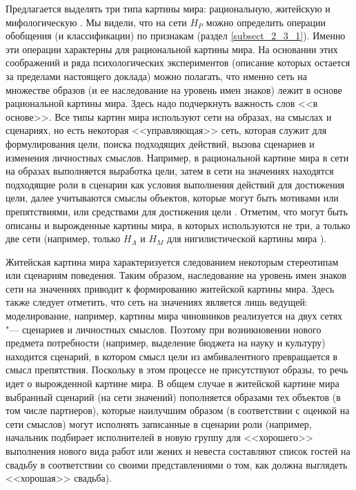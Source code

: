 Предлагается выделять три типа картины мира: рациональную, житейскую и мифологическую \cite{Chudova2012}. 
Мы видели, что на сети $H_P$ можно определить операции обобщения (и классификации) по признакам (раздел \ref{subsect_2_3_1}). Именно эти операции характерны для рациональной картины мира. На основании этих соображений и ряда психологических экспериментов (описание которых остается за пределами настоящего доклада) можно полагать, что именно сеть на множестве образов (и ее наследование на уровень имен знаков) лежит в основе рациональной картины мира. Здесь надо подчеркнуть важность слов <<в основе>>. Все типы картин мира используют сети на образах, на смыслах и сценариях, но есть некоторая <<управляющая>> сеть, которая служит для формулирования цели, поиска подходящих действий, вызова сценариев и изменения личностных смыслов. Например, в рациональной картине мира в сети на образах выполняется выработка цели, затем в сети на значениях находятся подходящие роли в сценарии как условия выполнения действий для достижения цели, далее учитываются смыслы объектов, которые могут быть мотивами или препятствиями, или средствами для достижения цели \cite{Chudova2014}. Отметим, что могут быть описаны и вырожденные картины мира, в которых используются не три, а только две сети (например, только $H_A$ и $H_M$ для нигилистической картины мира \cite{Chudova2012}). 

Житейская картина мира характеризуется следованием некоторым стереотипам или сценариям поведения. Таким образом, наследование на уровень имен знаков сети на значениях приводит к формированию житейской картины мира. Здесь также следует отметить, что сеть на значениях является лишь ведущей: моделирование, например, картины мира чиновников реализуется на двух сетях "--- сценариев и личностных смыслов. Поэтому при возникновении нового предмета потребности (например, выделение бюджета на науку и культуру) находится сценарий, в котором смысл цели из амбивалентного превращается в смысл препятствия. Поскольку в этом процессе не присутствуют образы, то речь идет о вырожденной картине мира. В общем случае в житейской картине мира выбранный сценарий (на сети значений) пополняется образами тех объектов (в том числе партнеров), которые наилучшим образом (в соответствии с оценкой на сети смыслов) могут исполнять записанные в сценарии роли (например, начальник подбирает исполнителей в новую группу для <<хорошего>> выполнения нового вида работ или жених и невеста составляют список гостей на свадьбу в соответствии со своими представлениями о том, как должна выглядеть <<хорошая>> свадьба).

